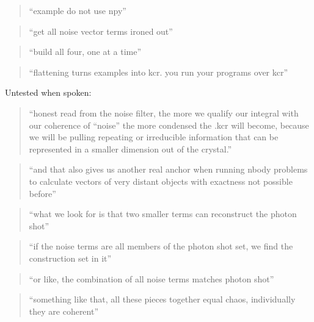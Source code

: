 \begin{quote}
“example do not use npy”

\end{quote}

\begin{quote}
“get all noise vector terms ironed out”

\end{quote}

\begin{quote}
“build all four, one at a time”

\end{quote}

\begin{quote}
“flattening turns examples into kcr. you run your programs over kcr”

\end{quote}

Untested when spoken:

\begin{quote}
“honest read from the noise filter, the more we qualify our integral with our coherence of “noise” the more condensed the .kcr will become, because we will be pulling repeating or irreducible information that can be represented in a smaller dimension out of the crystal.”

\end{quote}

\begin{quote}
“and that also gives us another real anchor when running nbody problems to calculate vectors of very distant objects with exactness not possible before”

\end{quote}

\begin{quote}
“what we look for is that two smaller terms can reconstruct the photon shot”

\end{quote}

\begin{quote}
“if the noise terms are all members of the photon shot set, we find the construction set in it”

\end{quote}

\begin{quote}
“or like, the combination of all noise terms matches photon shot”

\end{quote}

\begin{quote}
“something like that, all these pieces together equal chaos, individually they are coherent”

\end{quote}

